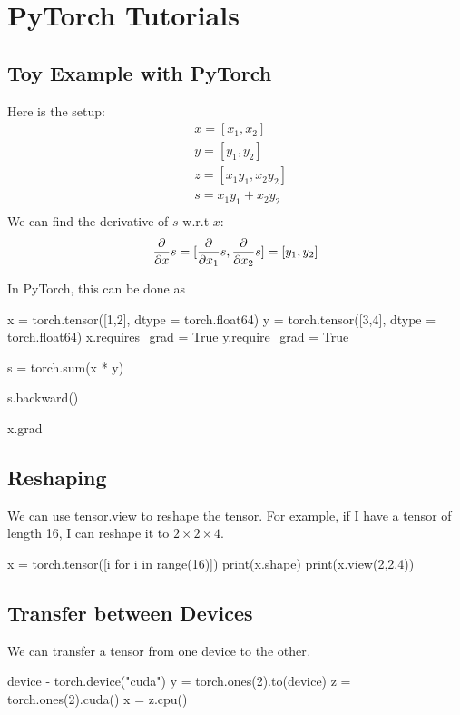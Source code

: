 \chapter{PyTorch Tutorials} 

\section{Toy Example with PyTorch}
Here is the setup: 
    \begin{align*}
        & x = [x_1, x_2] \\
        & y = [y_1, y_2] \\
        & z = [x_1 y_1 , x_2 y_2 ]\\
        & s = x_1 y_1 + x_2 y_2 \\
    \end{align*}
We can find the derivative of $s$ w.r.t $x$: 
    \begin{align*}
        \frac{\partial}{\partial x} s = [\frac{\partial}{\partial x_1} s , \frac{\partial}{\partial x_2} s ] = [y_1, y_2]
    \end{align*}

In PyTorch, this can be done as 
    \begin{python}
    x = torch.tensor([1,2], dtype = torch.float64)
    y = torch.tensor([3,4], dtype = torch.float64)
    x.requires_grad = True
    y.require_grad = True
    
    s = torch.sum(x * y)
    
    s.backward()
    
    x.grad
    \end{python}
    
\section{Reshaping}
We can use tensor.view to reshape the tensor. For example, if I have a tensor of length 16, I can reshape it to $2 \times 2 \times 4$. 
    \begin{python}
    x = torch.tensor([i for i in range(16)])
    print(x.shape)
    print(x.view(2,2,4))    
    \end{python}

\section{Transfer between Devices}
We can transfer a tensor from one device to the other. 
    \begin{python}
    device - torch.device("cuda")
    y = torch.ones(2).to(device)
    z = torch.ones(2).cuda()
    x = z.cpu()
    \end{python}